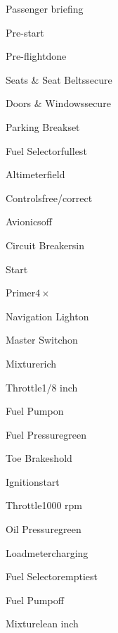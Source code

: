 




\begin{multicols}{2}
\begin{checklist}{Passenger briefing}
\end{checklist}

\begin{checklist}{Pre-start}
    \item{Pre-flight}{done}
    \item{Seats \& Seat Belts}{secure}
    \item{Doors \& Windows}{secure}
    \item{Parking Break}{set}
    \item{Fuel Selector}{fullest}
    \item{Altimeter}{field}
    \item{Controls}{free/correct}
    \item{Avionics}{off}
    \item{Circuit Breakers}{in}
\end{checklist}

\begin{checklist}{Start}
    \item{Primer}{$4\times$}
    \item{Navigation Light}{on}
    \item{Master Switch}{on}
    \item{Mixture}{rich}
    \item{Throttle}{1/8 inch}
    \item{Fuel Pump}{on}
    \item{Fuel Pressure}{green}
    \item{Toe Brakes}{hold}
    \item{Ignition}{start}
    \item{Throttle}{1000 rpm}
    \item{Oil Pressure}{green}
    \item{Loadmeter}{charging}
    \item{Fuel Selector}{emptiest}
    \item{Fuel Pump}{off}
    \item{Mixture}{lean  inch}
\end{checklist}


\end{multicols}
